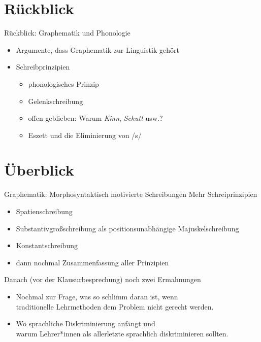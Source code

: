 
\section{Rückblick}

\begin{frame}
  {Rückblick: Graphematik und Phonologie}
  \pause
  \begin{itemize}[<+->]
    \item Argumente, dass Graphematik zur Linguistik gehört
      \Halbzeile
    \item Schreibprinzipien
      \begin{itemize}[<+->]
        \item phonologisches Prinzip
        \item Gelenkschreibung
        \item offen geblieben: Warum \textit{Kinn}, \textit{Schutt} usw.?
        \item Eszett und die Eliminierung von /s/
      \end{itemize}
  \end{itemize}
\end{frame}


\section{Überblick}

\begin{frame}
  {Graphematik: Morphosyntaktisch motivierte Schreibungen}
  \pause
  Mehr Schreiprinzipien\\
  \Halbzeile
  \pause
  \begin{itemize}[<+->]
    \item Spatienschreibung
    \item Substantivgroßschreibung als positionsunabhängige Majuskelschreibung
    \item Konstantschreibung
      \Halbzeile
    \item dann nochmal Zusammenfassung aller Prinzipien
  \end{itemize}
  \pause
  \Halbzeile
  Danach (vor der Klausurbesprechung) noch zwei Ermahnungen\\
  \Halbzeile
  \pause
  \begin{itemize}[<+->]
    \item Nochmal zur Frage, was so schlimm daran ist, wenn \\
      traditionelle Lehrmethoden dem Problem nicht gerecht werden.
    \item Wo sprachliche Diskriminierung anfängt und\\
     warum Lehrer*innen als allerletzte sprachlich diskriminieren sollten.
  \end{itemize}
\end{frame}

